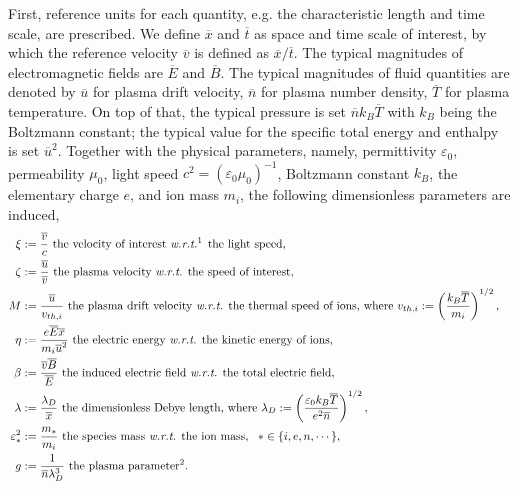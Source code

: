\documentclass{article}
\begin{document}
First, reference units for each quantity, e.g. the characteristic length and time scale, are prescribed. We define $\overline{x}$ and $\overline{t}$ as space and time scale of interest, by which the reference velocity $\overline{v}$ is defined as $\overline{x}/\overline{t}$. The typical magnitudes of electromagnetic fields are $\overline{E}$ and $\overline{B}$. The typical magnitudes of fluid quantities are denoted by $\overline{u}$ for plasma drift velocity, $\overline{n}$ for plasma number density, $\overline{T}$ for plasma temperature. On top of that, the typical pressure is set $\overline{n}k_B\overline{T}$ with $k_B$ being the Boltzmann constant; the typical value for the specific total energy and enthalpy is set $\overline{u}^2$. Together with the physical parameters, namely, permittivity $\varepsilon_0$, permeability $\mu_0$, light speed $c^2 = (\varepsilon_0\mu_0)^{-1}$, Boltzmann constant $k_B$, the elementary charge $e$, and ion mass $m_i$, the following dimensionless parameters are induced,
\begin{align*} 
    \xi &:= \frac{\overline{v}}{c} \text{ the velocity of interest \emph{w.r.t.}\footnotemark[1] the light speed}, &\\
    \zeta &:= \frac{\overline{u}}{\overline{v}} \text{ the plasma velocity \emph{w.r.t.} the speed of interest}, &\\
    M &:= \frac{\overline{u}}{v_{th,i}} \text{ the plasma drift velocity \emph{w.r.t.} the thermal speed of ions, where } v_{th,i} := \left(\frac{k_B \overline{T}}{m_i}\right)^{1/2}, &\\
    \eta &:= \frac{e\overline{E}\overline{x}}{m_i\overline{u}^2} \text{ the electric energy \emph{w.r.t.} the kinetic energy of ions}, &\\
    \beta &:= \frac{\overline{v}\overline{B}}{\overline{E}} \text{ the induced electric field \emph{w.r.t.} the total electric field}, &\\
    \lambda &:= \frac{\lambda_D}{\overline{x}} \text{ the dimensionless Debye length, where }\lambda_D := \left(\frac{\varepsilon_0k_B\overline{T}}{e^2\overline{n}}\right)^{1/2}, &\\
    \varepsilon_*^2 &:= \frac{m_*}{m_i} \text{ the species mass \emph{w.r.t.} the ion mass},\ \  * \in \{i,e,n,\cdots\}, &\\
    g &:= \frac{1}{\overline{n}\lambda_D^3} \text{ the plasma parameter\footnotemark[2]}.&
\end{align*}
\end{document}
